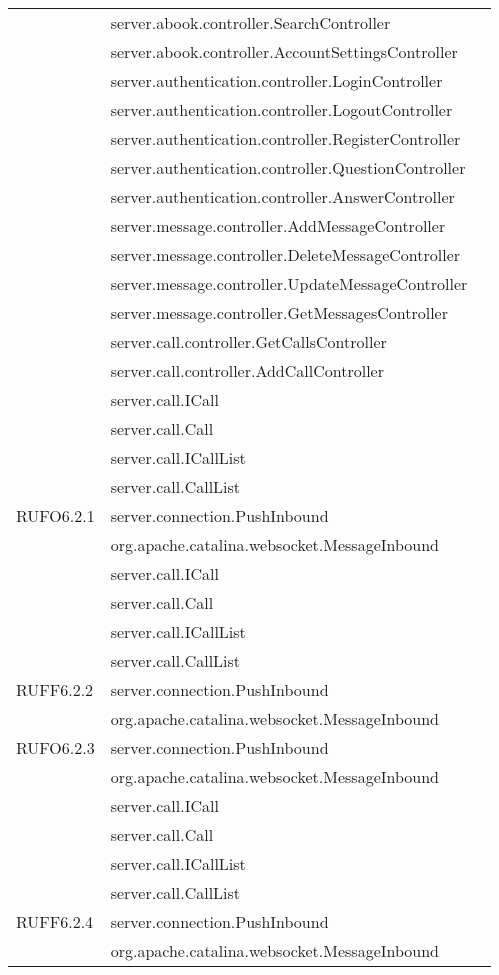 \begin{center}
\begin{longtable}{lp{}l}
& server.abook.controller.SearchController\\
& server.abook.controller.AccountSettingsController\\
& server.authentication.controller.LoginController\\
& server.authentication.controller.LogoutController\\
& server.authentication.controller.RegisterController\\
& server.authentication.controller.QuestionController\\
& server.authentication.controller.AnswerController\\
& server.message.controller.AddMessageController\\
& server.message.controller.DeleteMessageController\\
& server.message.controller.UpdateMessageController\\
& server.message.controller.GetMessagesController\\
& server.call.controller.GetCallsController\\
& server.call.controller.AddCallController\\
& server.call.ICall\\
& server.call.Call\\
& server.call.ICallList\\
& server.call.CallList\\
RUFO6.2.1 & server.connection.PushInbound\\
& org.apache.catalina.websocket.MessageInbound\\
& server.call.ICall\\
& server.call.Call\\
& server.call.ICallList\\
& server.call.CallList\\
RUFF6.2.2 & server.connection.PushInbound\\
& org.apache.catalina.websocket.MessageInbound\\
RUFO6.2.3 & server.connection.PushInbound\\
& org.apache.catalina.websocket.MessageInbound\\
& server.call.ICall\\
& server.call.Call\\
& server.call.ICallList\\
& server.call.CallList\\
RUFF6.2.4 & server.connection.PushInbound\\
& org.apache.catalina.websocket.MessageInbound\\

\end{longtable}
\end{center}
